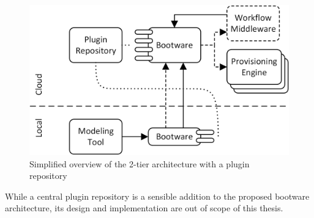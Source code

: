 \begin{figure}[!htbp]
	\centering
	\includegraphics[resolution=600]{design/assets/simple_plugin_repository}
	\caption{Simplified overview of the 2-tier architecture with a plugin repository}
	\label{image:plugin_repository}
\end{figure}

While a central plugin repository is a sensible addition to the proposed bootware architecture, its design and implementation are out of scope of this thesis.
